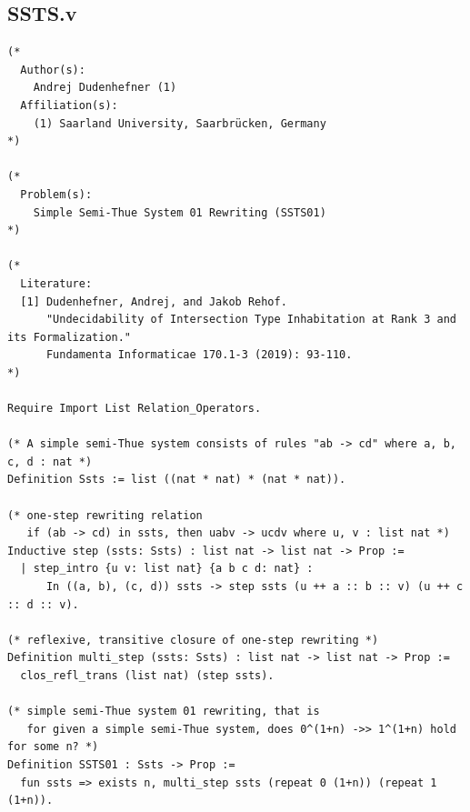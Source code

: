 \documentclass[10pt,a4paper]{amsart}
\begin{document}
\subsection*{SSTS.v}
\begin{lstlisting}
(* 
  Author(s):
    Andrej Dudenhefner (1) 
  Affiliation(s):
    (1) Saarland University, Saarbrücken, Germany
*)

(* 
  Problem(s):
    Simple Semi-Thue System 01 Rewriting (SSTS01)
*)

(*
  Literature:
  [1] Dudenhefner, Andrej, and Jakob Rehof. 
      "Undecidability of Intersection Type Inhabitation at Rank 3 and its Formalization." 
      Fundamenta Informaticae 170.1-3 (2019): 93-110.
*)

Require Import List Relation_Operators.

(* A simple semi-Thue system consists of rules "ab -> cd" where a, b, c, d : nat *)
Definition Ssts := list ((nat * nat) * (nat * nat)).

(* one-step rewriting relation 
   if (ab -> cd) in ssts, then uabv -> ucdv where u, v : list nat *)
Inductive step (ssts: Ssts) : list nat -> list nat -> Prop := 
  | step_intro {u v: list nat} {a b c d: nat} : 
      In ((a, b), (c, d)) ssts -> step ssts (u ++ a :: b :: v) (u ++ c :: d :: v).

(* reflexive, transitive closure of one-step rewriting *)
Definition multi_step (ssts: Ssts) : list nat -> list nat -> Prop := 
  clos_refl_trans (list nat) (step ssts).

(* simple semi-Thue system 01 rewriting, that is
   for given a simple semi-Thue system, does 0^(1+n) ->> 1^(1+n) hold for some n? *)
Definition SSTS01 : Ssts -> Prop :=
  fun ssts => exists n, multi_step ssts (repeat 0 (1+n)) (repeat 1 (1+n)).
  
\end{lstlisting}
\end{document}
